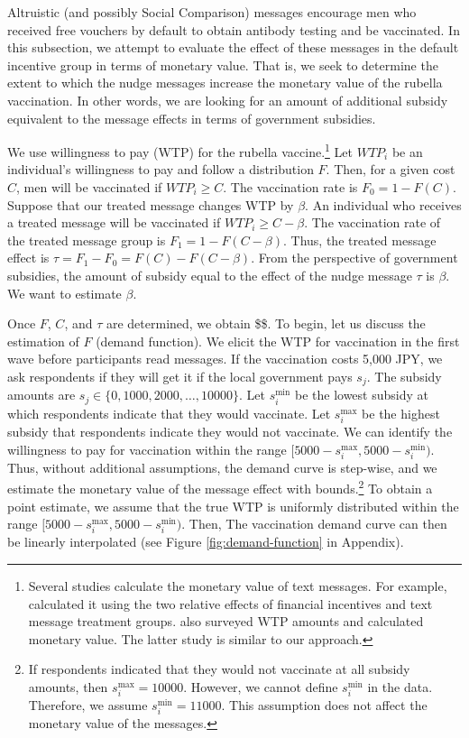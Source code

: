 \documentclass[
]{article}
\begin{document}
Altruistic (and possibly Social Comparison) messages encourage men who received free vouchers by default to obtain antibody testing and be vaccinated. In this subsection, we attempt to evaluate the effect of these messages in the default incentive group in terms of monetary value. That is, we seek to determine the extent to which the nudge messages increase the monetary value of the rubella vaccination. In other words, we are looking for an amount of additional subsidy equivalent to the message effects in terms of government subsidies.

We use willingness to pay (WTP) for the rubella vaccine.\footnote{Several studies calculate the monetary value of text messages. For example,\cite{Bursztyn2019} calculated it using the two relative effects of financial incentives and text message treatment groups. \cite{Moriwaki2020} also surveyed WTP amounts and calculated monetary value. The latter study is similar to our approach.} Let \(WTP_i\) be an individual's willingness to pay and follow a distribution \(F\). Then, for a given cost \(C\), men will be vaccinated if \(WTP_i \ge C\). The vaccination rate is \(F_0 = 1-F(C)\). Suppose that our treated message changes WTP by \(\beta\). An individual who receives a treated message will be vaccinated if \(WTP_i\ge C-\beta\). The vaccination rate of the treated message group is \(F_1 = 1-F(C-\beta)\). Thus, the treated message effect is \(\tau = F_1-F_0=F(C)-F(C-\beta)\). From the perspective of government subsidies, the amount of subsidy equal to the effect of the nudge message \(\tau\) is \(\beta\). We want to estimate \(\beta\).

Once \(F\), \(C\), and \(\tau\) are determined, we obtain \$\beta \$. To begin, let us discuss the estimation of \(F\) (demand function). We elicit the WTP for vaccination in the first wave before participants read messages. If the vaccination costs 5,000 JPY, we ask respondents if they will get it if the local government pays \(s_j\). The subsidy amounts are \(s_j \in \{0, 1000, 2000, \ldots , 10000\}\). Let \(s_i^{\text{min}}\) be the lowest subsidy at which respondents indicate that they would vaccinate. Let \(s_i^{\text{max}}\) be the highest subsidy that respondents indicate they would not vaccinate. We can identify the willingness to pay for vaccination within the range \([5000 - s_i^{\text{max}}, 5000 - s_i^{\text{min}})\). Thus, without additional assumptions, the demand curve is step-wise, and we estimate the monetary value of the message effect with bounds.\footnote{If respondents indicated that they would not vaccinate at all subsidy amounts, then \(s_i^{\text{max}} = 10000\). However, we cannot define \(s_i^{\text{min}}\) in the data. Therefore, we assume \(s_i^{\text{min}} = 11000\). This assumption does not affect the monetary value of the messages.} To obtain a point estimate, we assume that the true WTP is uniformly distributed within the range \([5000 - s_i^{\text{max}}, 5000 - s_i^{\text{min}})\). Then, The vaccination demand curve can then be linearly interpolated (see Figure \ref{fig:demand-function} in Appendix).
\end{document}
